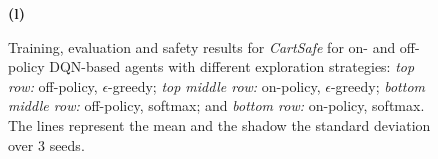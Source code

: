 \begin{figure}[h!]
\begin{minipage}[b]{0.32\textwidth}
        \textbf{(l)}
        \label{fig:cartsafe_dqn:sub12}
    \end{minipage}

    \caption[Single-agent Results for \textit{CartSafe} (PLTD agents).]{Training, evaluation and safety results for \textit{CartSafe} for on- and off-policy DQN-based agents with different exploration strategies: \textit{top row:} off-policy, $\epsilon$-greedy; \textit{top middle row:} on-policy, $\epsilon$-greedy; \textit{bottom middle row:} off-policy, softmax; and \textit{bottom row:} on-policy, softmax. The lines represent the mean and the shadow the standard deviation over 3 seeds.}
    \label{fig:cartsafe_dqn}
\end{figure}